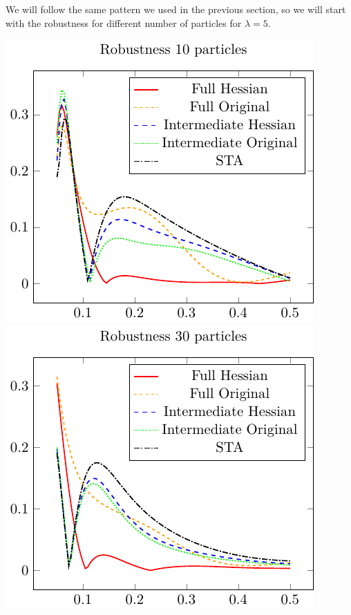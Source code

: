 We will follow the same pattern we used in the previous section, so we will start with the robustness for different number of particles for $ \lambda = 5 $.

\includegraphics{./gfx/robustness_np10_nlambda5.pdf}
\includegraphics{./gfx/robustness_np30_nlambda5.pdf}

